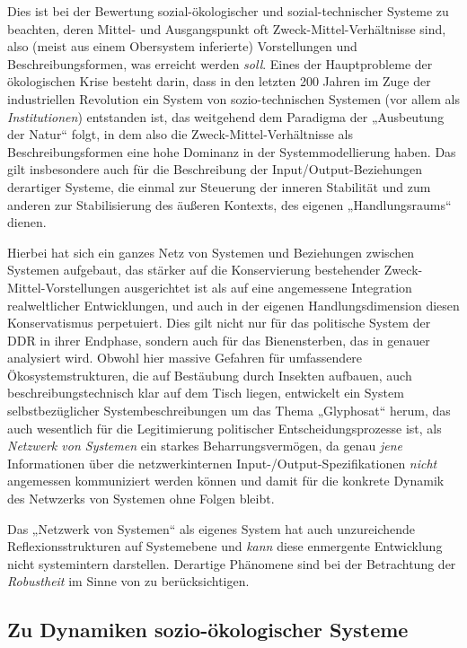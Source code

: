\documentclass[11pt,a4paper]{article}
\begin{document}
Dies ist bei der Bewertung sozial-ökologischer und sozial-technischer Systeme
zu beachten, deren Mittel- und Ausgangspunkt oft Zweck-Mittel-Verhältnisse
sind, also (meist aus einem Obersystem inferierte) Vorstellungen und
Beschreibungsformen, was erreicht werden \emph{soll}. Eines der Hauptprobleme
der ökologischen Krise besteht darin, dass in den letzten 200 Jahren im Zuge
der industriellen Revolution ein System von sozio-technischen Systemen (vor
allem als \emph{Institutionen}) entstanden ist, das weitgehend dem Paradigma
der „Ausbeutung der Natur“ folgt, in dem also die Zweck-Mittel-Verhältnisse
als Beschreibungsformen eine hohe Dominanz in der Systemmodellierung
haben. Das gilt insbesondere auch für die Beschreibung der
Input/Output-Beziehungen derartiger Systeme, die einmal zur Steuerung der
inneren Stabilität und zum anderen zur Stabilisierung des äußeren Kontexts,
des eigenen „Handlungsraums“ dienen.

Hierbei hat sich ein ganzes Netz von Systemen und Beziehungen zwischen
Systemen aufgebaut, das stärker auf die Konservierung bestehender
Zweck-Mittel-Vorstellungen ausgerichtet ist als auf eine angemessene
Integration realweltlicher Entwicklungen, und auch in der eigenen
Handlungsdimension diesen Konservatismus perpetuiert. Dies gilt nicht nur für
das politische System der DDR in ihrer Endphase, sondern auch für das
Bienensterben, das in \cite{Jacobasch2019} genauer analysiert wird.  Obwohl
hier massive Gefahren für umfassendere Ökosystemstrukturen, die auf Bestäubung
durch Insekten aufbauen, auch beschreibungstechnisch klar auf dem Tisch
liegen, entwickelt ein System selbstbezüglicher Systembeschreibungen um das
Thema „Glyphosat“ herum, das auch wesentlich für die Legitimierung politischer
Entscheidungsprozesse ist, als \emph{Netzwerk von Systemen} ein starkes
Beharrungsvermögen, da genau \emph{jene} Informationen über die
netzwerkinternen Input-/Output-Spezifikationen \emph{nicht} angemessen
kommuniziert werden können und damit für die konkrete Dynamik des Netwzerks
von Systemen ohne Folgen bleibt.

Das „Netzwerk von Systemen“ als eigenes System hat auch unzureichende
Reflexionsstrukturen auf Systemebene und \emph{kann} diese enmergente
Entwicklung nicht systemintern darstellen. Derartige Phänomene sind bei der
Betrachtung der \emph{Robustheit} im Sinne von \cite{Anderies2004} zu
berücksichtigen.

\subsection{Zu Dynamiken sozio-ökologischer Systeme}
\end{document}
